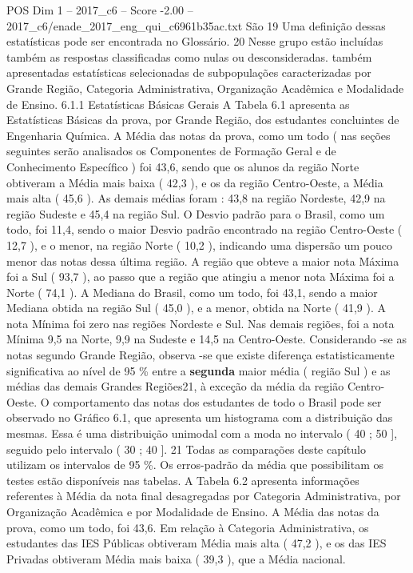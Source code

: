 \begin{textsample}{POS Dim 1 – 2017\_c6 – Score -2.00 – 2017\_c6/enade\_2017\_eng\_qui\_c6961b35ac.txt}
São 19 Uma definição dessas estatísticas pode ser encontrada no Glossário. 20 Nesse grupo estão incluídas também as respostas classificadas como nulas ou desconsideradas. também apresentadas estatísticas selecionadas de subpopulações caracterizadas por Grande Região, Categoria Administrativa, Organização Acadêmica e Modalidade de Ensino. 6.1.1 Estatísticas Básicas Gerais A Tabela 6.1 apresenta as Estatísticas Básicas da prova, por Grande Região, dos estudantes concluintes de Engenharia Química.
A Média das notas da prova, como um todo ( nas seções seguintes serão analisados os Componentes de Formação Geral e de Conhecimento Específico ) foi 43,6, sendo que os alunos da região Norte obtiveram a Média mais baixa ( 42,3 ), e os da região Centro-Oeste, a Média mais alta ( 45,6 ).
As demais médias foram : 43,8 na região Nordeste, 42,9 na região Sudeste e 45,4 na região Sul.
O Desvio padrão para o Brasil, como um todo, foi 11,4, sendo o maior Desvio padrão encontrado na região Centro-Oeste ( 12,7 ), e o menor, na região Norte ( 10,2 ), indicando uma dispersão um pouco menor das notas dessa última região.
A região que obteve a maior nota Máxima foi a Sul ( 93,7 ), ao passo que a região que atingiu a menor nota Máxima foi a Norte ( 74,1 ).
A Mediana do Brasil, como um todo, foi 43,1, sendo a maior Mediana obtida na região Sul ( 45,0 ), e a menor, obtida na Norte ( 41,9 ).
A nota Mínima foi zero nas regiões Nordeste e Sul.
Nas demais regiões, foi a nota Mínima 9,5 na Norte, 9,9 na Sudeste e 14,5 na Centro-Oeste.
Considerando -se as notas segundo Grande Região, observa -se que existe diferença estatisticamente significativa ao nível de 95 \% entre a \textbf{segunda} maior média ( região Sul ) e as médias das demais Grandes Regiões21, à exceção da média da região Centro-Oeste.
O comportamento das notas dos estudantes de todo o Brasil pode ser observado no Gráfico 6.1, que apresenta um histograma com a distribuição das mesmas.
Essa é uma distribuição unimodal com a moda no intervalo ( 40 ; 50 ], seguido pelo intervalo ( 30 ; 40 ]. 21 Todas as comparações deste capítulo utilizam os intervalos de 95 \%.
Os erros-padrão da média que possibilitam os testes estão disponíveis nas tabelas.
A Tabela 6.2 apresenta informações referentes à Média da nota final desagregadas por Categoria Administrativa, por Organização Acadêmica e por Modalidade de Ensino.
A Média das notas da prova, como um todo, foi 43,6.
Em relação à Categoria Administrativa, os estudantes das IES Públicas obtiveram Média mais alta ( 47,2 ), e os das IES Privadas obtiveram Média mais baixa ( 39,3 ), que a Média nacional.

\end{textsample}
